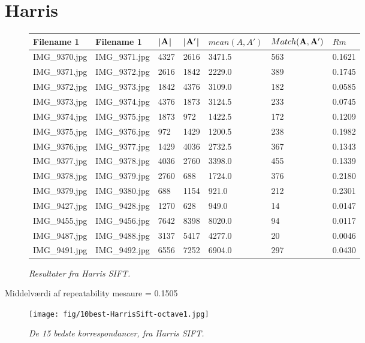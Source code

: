 \section{Harris}
\begin{figure}[H]
    \centering
    \begin{center}    
    \begin{tabular}{ | l | l | l | l | l | l | l |}
    \hline
    Filename 1 & Filename 1 & |$\bold{A}$| & |$\bold{A'}$| & $mean(A,A')$ & $Match(\bold{A}, \bold{A}')$ & $Rm$ \\ \hline
IMG\_9370.jpg &	IMG\_9371.jpg &	4327 &	2616 &	3471.5 &	563 &	0.1621\\ \hline
IMG\_9371.jpg &	IMG\_9372.jpg &	2616 &	1842 &	2229.0 &	389 &	0.1745\\ \hline
IMG\_9372.jpg &	IMG\_9373.jpg &	1842 &	4376 &	3109.0 &	182 &	0.0585\\ \hline
IMG\_9373.jpg &	IMG\_9374.jpg &	4376 &	1873 &	3124.5 &	233 &	0.0745\\ \hline
IMG\_9374.jpg &	IMG\_9375.jpg &	1873 &	972 &	1422.5 &	172 &	0.1209\\ \hline
IMG\_9375.jpg &	IMG\_9376.jpg &	972 &	1429 &	1200.5 &	238 &	0.1982\\ \hline
IMG\_9376.jpg &	IMG\_9377.jpg &	1429 &	4036 &	2732.5 &	367 &	0.1343\\ \hline
IMG\_9377.jpg &	IMG\_9378.jpg &	4036 &	2760 &	3398.0 &	455 &	0.1339\\ \hline
IMG\_9378.jpg &	IMG\_9379.jpg &	2760 &	688 &	1724.0 &	376 &	0.2180\\ \hline
IMG\_9379.jpg &	IMG\_9380.jpg &	688 &	1154 &	921.0  &	212 &	0.2301\\ \hline
IMG\_9427.jpg &	IMG\_9428.jpg &	1270 &	628 &	949.0 &		14 &	0.0147\\ \hline
IMG\_9455.jpg &	IMG\_9456.jpg &	7642 &	8398 &	8020.0 &	94 &	0.0117\\ \hline
IMG\_9487.jpg &	IMG\_9488.jpg &	3137 &	5417 &	4277.0 &	20 &	0.0046\\ \hline
IMG\_9491.jpg &	IMG\_9492.jpg &	6556 &	7252 &	6904.0 &	297 &	0.0430\\ \hline

    \end{tabular}       
    \caption{{\footnotesize \textit{Resultater fra Harris SIFT.}}}
    \label{tab:HARRISOCTAVE2}
     \end{center}
     \vspace{-2.5em}
\end{figure} \noindent
Middelværdi af repeatability mesaure  = 0.1505
\begin{figure}[H]
    \centering
    \texttt{[image: fig/10best-HarrisSift-octave1.jpg]}
    \vspace{-0.5em}   
    \begin{center}
    \caption{{\footnotesize \textit{ De 15 bedste korrespondancer, fra Harris SIFT.}}}
    \label{fig:harsift}
     \end{center}
  \end{figure}
       \vspace{-2.7em}
\noindent

